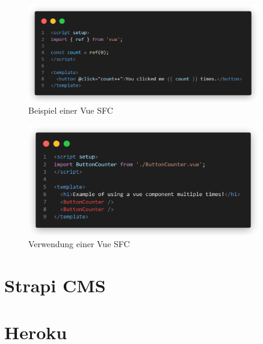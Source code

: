 \begin{figure}[H]
  \includegraphics[width=0.9\textwidth]{images/vue-example.png}
  \centering
  \caption[Beispiel einer Vue-Komponente]{Beispiel einer Vue \ac{SFC} \cite{VueComponentBasics}}
  \label{fig:vue-example}
\end{figure}

\begin{figure}[H]
  \includegraphics[width=0.9\textwidth]{images/vue-example-usage.png}
  \centering
  \caption[Verwendung einer Vue-Komponente]{Verwendung einer Vue \ac{SFC} \cite[vgl.][]{VueComponentBasics}}
  \label{fig:vue-example-usage}
\end{figure}

%
%
\section{Strapi CMS}

%
%
\section{Heroku}
